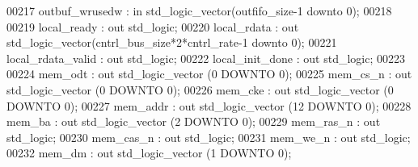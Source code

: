 \begin{DoxyCode}
00217         outbuf_wrusedw      : \textcolor{keywordflow}{in} \textcolor{comment}{std\_logic\_vector}(outfifo_size\textcolor{vhdlchar}{-}\textcolor{vhdllogic}{}\textcolor{vhdllogic}{1} \textcolor{keywordflow}{downto} \textcolor{vhdllogic}{}\textcolor{vhdllogic}{0});
00218 
00219         local_ready         : \textcolor{keywordflow}{out} \textcolor{comment}{std\_logic};
00220         local_rdata         : \textcolor{keywordflow}{out} \textcolor{comment}{std\_logic\_vector}(cntrl_bus_size*\textcolor{vhdllogic}{}\textcolor{vhdllogic}{2}*cntrl_rate\textcolor{vhdlchar}{-}\textcolor{vhdllogic}{}\textcolor{vhdllogic}{1} \textcolor{keywordflow}{downto} \textcolor{vhdllogic}{}\textcolor{vhdllogic}{0});
00221         local_rdata_valid   : \textcolor{keywordflow}{out} \textcolor{comment}{std\_logic};
00222         local_init_done : \textcolor{keywordflow}{out} \textcolor{comment}{std\_logic};
00223 
00224         mem_odt             : \textcolor{keywordflow}{out} \textcolor{comment}{std\_logic\_vector} (\textcolor{vhdllogic}{}\textcolor{vhdllogic}{0} \textcolor{keywordflow}{DOWNTO} \textcolor{vhdllogic}{}\textcolor{vhdllogic}{0});
00225         mem_cs_n                : \textcolor{keywordflow}{out} \textcolor{comment}{std\_logic\_vector} (\textcolor{vhdllogic}{}\textcolor{vhdllogic}{0} \textcolor{keywordflow}{DOWNTO} \textcolor{vhdllogic}{}\textcolor{vhdllogic}{0});
00226         mem_cke             : \textcolor{keywordflow}{out} \textcolor{comment}{std\_logic\_vector} (\textcolor{vhdllogic}{}\textcolor{vhdllogic}{0} \textcolor{keywordflow}{DOWNTO} \textcolor{vhdllogic}{}\textcolor{vhdllogic}{0});
00227         mem_addr                : \textcolor{keywordflow}{out} \textcolor{comment}{std\_logic\_vector} (\textcolor{vhdllogic}{}\textcolor{vhdllogic}{12} \textcolor{keywordflow}{DOWNTO} \textcolor{vhdllogic}{}\textcolor{vhdllogic}{0});
00228         mem_ba              : \textcolor{keywordflow}{out} \textcolor{comment}{std\_logic\_vector} (\textcolor{vhdllogic}{}\textcolor{vhdllogic}{2} \textcolor{keywordflow}{DOWNTO} \textcolor{vhdllogic}{}\textcolor{vhdllogic}{0});
00229         mem_ras_n           : \textcolor{keywordflow}{out} \textcolor{comment}{std\_logic};
00230         mem_cas_n           : \textcolor{keywordflow}{out} \textcolor{comment}{std\_logic};
00231         mem_we_n                : \textcolor{keywordflow}{out} \textcolor{comment}{std\_logic};
00232         mem_dm              : \textcolor{keywordflow}{out} \textcolor{comment}{std\_logic\_vector} (\textcolor{vhdllogic}{}\textcolor{vhdllogic}{1} \textcolor{keywordflow}{DOWNTO} \textcolor{vhdllogic}{}\textcolor{vhdllogic}{0});

\end{DoxyCode}
